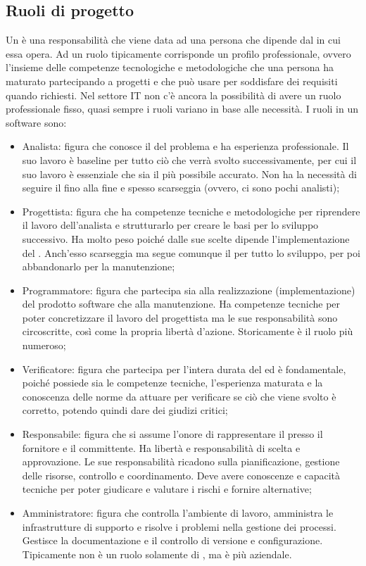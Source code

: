 \documentclass[../main]{subfiles}
\begin{document}
\subsection{Ruoli di progetto}
Un  è una responsabilità che viene data ad una persona che dipende dal  in cui essa opera. Ad un ruolo tipicamente corrisponde un profilo professionale, ovvero l'insieme delle competenze tecnologiche e metodologiche che una persona ha maturato partecipando a progetti e che può usare per soddisfare dei requisiti quando richiesti.\newline
Nel settore IT non c'è ancora la possibilità di avere un ruolo professionale fisso, quasi sempre i ruoli variano in base alle necessità. I ruoli in un  software sono:
\begin{itemize}
    \item Analista: figura che conosce il  del problema e ha esperienza professionale. Il suo lavoro è baseline per tutto ciò che verrà svolto successivamente, per cui il suo lavoro è essenziale che sia il più possibile accurato. Non ha la necessità di seguire il  fino alla fine e spesso scarseggia (ovvero, ci sono pochi analisti);
    \item Progettista: figura che ha competenze tecniche e metodologiche per riprendere il lavoro dell'analista e strutturarlo per creare le basi per lo sviluppo successivo. Ha molto peso poiché dalle sue scelte dipende l'implementazione del . Anch'esso scarseggia ma segue comunque il  per tutto lo sviluppo, per poi abbandonarlo per la manutenzione;
    \item Programmatore: figura che partecipa sia alla realizzazione (implementazione) del prodotto software che alla manutenzione. Ha competenze tecniche per poter concretizzare il lavoro del progettista ma le sue responsabilità sono circoscritte, così come la propria libertà d'azione. Storicamente è il ruolo più numeroso;
    \item Verificatore: figura che partecipa per l'intera durata del  ed è fondamentale, poiché possiede sia le competenze tecniche, l'esperienza maturata e la conoscenza delle norme da attuare per verificare se ciò che viene svolto è corretto, potendo quindi dare dei giudizi critici;
    \item Responsabile: figura che si assume l'onore di rappresentare il  presso il fornitore e il committente. Ha libertà e responsabilità di scelta e approvazione. Le sue responsabilità ricadono sulla pianificazione, gestione delle risorse, controllo e coordinamento. Deve avere conoscenze e capacità tecniche per poter giudicare e valutare i rischi e fornire alternative;
    \item Amministratore: figura che controlla l'ambiente di lavoro, amministra le infrastrutture di supporto e risolve i problemi nella gestione dei processi. Gestisce la documentazione e il controllo di versione e configurazione. Tipicamente non è un ruolo solamente di , ma è più aziendale.
\end{itemize}
\end{document}
